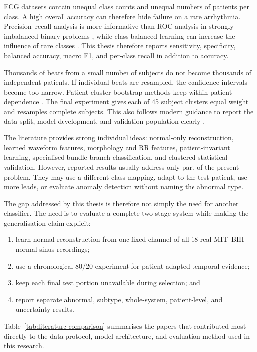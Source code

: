 ECG datasets contain unequal class counts and unequal numbers of patients per
class. A high overall accuracy can therefore hide failure on a rare arrhythmia.
Precision--recall analysis is more informative than ROC analysis in strongly
imbalanced binary problems \cite{saito2015pr}, while class-balanced learning can
increase the influence of rare classes \cite{cui2019classbalanced}. This thesis
therefore reports sensitivity, specificity, balanced accuracy, macro F1, and
per-class recall in addition to accuracy.

Thousands of beats from a small number of subjects do not become thousands of
independent patients. If individual beats are resampled, the confidence
intervals become too narrow. Patient-cluster bootstrap methods keep
within-patient dependence \cite{rutter2000clustered}. The final experiment gives
each of 45 subject clusters equal weight and resamples complete subjects. This
also follows modern guidance to report the data split, model development, and
validation population clearly \cite{collins2024tripodai}.

The literature provides strong individual ideas: normal-only reconstruction,
learned waveform features, morphology and RR features, patient-invariant
learning, specialised bundle-branch classification, and clustered statistical
validation. However, reported results usually address only part of the present
problem. They may use a different class mapping, adapt to the test patient, use
more leads, or evaluate anomaly detection without naming the abnormal type.

The gap addressed by this thesis is therefore not simply the need for another
classifier. The need is to evaluate a complete two-stage system while making
the generalisation claim explicit:
\begin{enumerate}
    \item learn normal reconstruction from one fixed channel of all 18 real
    MIT--BIH normal-sinus recordings;
    \item use a chronological 80/20 experiment for patient-adapted temporal evidence;
    \item keep each final test portion unavailable during selection; and
    \item report separate abnormal, subtype, whole-system, patient-level, and
    uncertainty results.
\end{enumerate}

Table~\ref{tab:literature-comparison} summarises the papers that contributed most
directly to the data protocol, model architecture, and evaluation method used in
this research.

